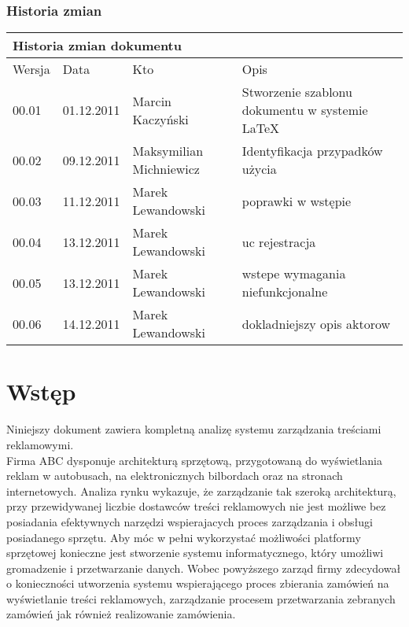 \documentclass[10pt,a4paper,titlepage]{article} %
\begin{document}
	\subsubsection*{Historia zmian}
		\begin{table}[h]
		\begin{tabular}{|m{1cm}|m{2cm}|m{3.5cm}|m{6.5cm}|}
			\hline
			\multicolumn{4}{|l|}{Historia zmian dokumentu} \\
			\hline
			\hline Wersja  & Data & Kto & Opis  \\ 
			\hline 00.01 & 01.12.2011 & Marcin Kaczyński & Stworzenie szablonu dokumentu w systemie \LaTeX \\ 
			\hline 00.02 & 09.12.2011 & Maksymilian Michniewicz & Identyfikacja przypadków użycia \\ 
			\hline 00.03 & 11.12.2011 & Marek Lewandowski & poprawki w wstępie \\ 
			\hline 00.04 & 13.12.2011 & Marek Lewandowski & uc rejestracja \\ 
			\hline 00.05 & 13.12.2011 & Marek Lewandowski & wstepe wymagania
			niefunkcjonalne
			\\
			\hline 00.06 & 14.12.2011 & Marek Lewandowski & dokladniejszy opis aktorow \\
			\hline 
		\end{tabular} 
		\end{table}
	\newpage

	
	\tableofcontents
	\newpage
	

	\section{Wstęp}

		Niniejszy dokument zawiera kompletną analizę systemu zarządzania treściami
		reklamowymi.\\ 
		
		Firma ABC dysponuje architekturą sprzętową, przygotowaną do wyświetlania
		reklam w autobusach, na elektronicznych bilbordach oraz na stronach
		internetowych. Analiza rynku wykazuje, że zarządzanie tak szeroką architekturą,
		przy przewidywanej liczbie dostawców treści reklamowych nie jest możliwe
		bez posiadania efektywnych narzędzi wspierajacych proces zarządzania i obsługi
		posiadanego sprzętu. Aby móc w pełni wykorzystać możliwości platformy sprzętowej
		konieczne jest stworzenie systemu informatycznego, który umożliwi gromadzenie i 
		przetwarzanie danych. Wobec powyższego zarząd firmy zdecydował o konieczności
		utworzenia systemu wspierającego proces zbierania zamówień na wyświetlanie
		treści reklamowych, zarządzanie procesem przetwarzania zebranych zamówień jak 
		również realizowanie zamówienia.\\
		
\end{document}
